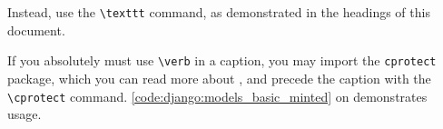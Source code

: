 Instead, use the \verb|\texttt| command, as demonstrated in the headings of this document.

If you absolutely must use \verb|\verb| in a caption, you may import the \verb|cprotect| package, which you can read more about , and precede the caption with the \verb|\cprotect| command. \autoref{code:django:models_basic_minted} on  demonstrates usage.
